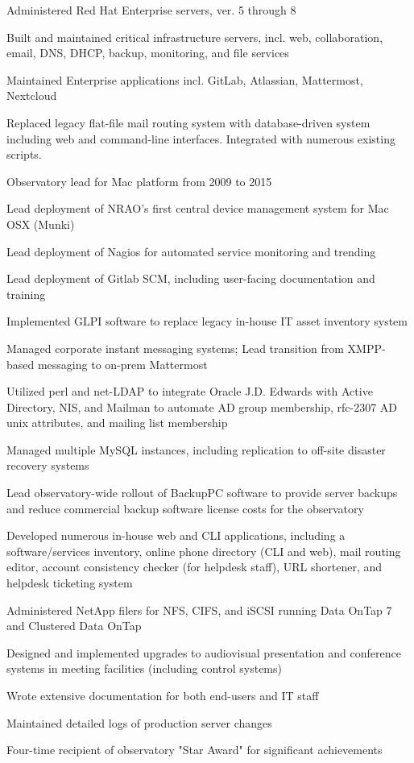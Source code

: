 \documentclass[letterpaper]{deedy-resume-openfont}
\begin{document}
\begin{minipage}[t]{0.69\textwidth}
\begin{tightemize}
	\item Administered Red Hat Enterprise servers, ver. 5 through 8
	\item Built and maintained critical infrastructure servers, incl. web, collaboration, email, DNS, DHCP, backup, monitoring, and file services
	\item Maintained Enterprise applications incl. GitLab, Atlassian, Mattermost, Nextcloud
	\item Replaced legacy flat-file mail routing system with database-driven system including web and command-line interfaces. Integrated with numerous existing scripts.
	\item Observatory lead for Mac platform from 2009 to 2015
	\item Lead deployment of NRAO's first central device management system for Mac OSX (Munki)
	\item Lead deployment of Nagios for automated service monitoring and trending
	\item Lead deployment of Gitlab SCM, including user-facing documentation and training
	\item Implemented GLPI software to replace legacy in-house IT asset inventory system
	\item Managed corporate instant messaging systems; Lead transition from XMPP-based messaging to on-prem Mattermost
	\item Utilized perl and net-LDAP to integrate Oracle J.D. Edwards with Active Directory, NIS, and Mailman to automate AD group membership, rfc-2307 AD unix attributes, and mailing list membership
	\item Managed multiple MySQL instances, including replication to off-site disaster recovery systems
	\item Lead observatory-wide rollout of BackupPC software to provide  server backups and reduce commercial backup software license costs for the observatory
	\item Developed numerous in-house web and CLI applications, including a software/services inventory, online phone directory (CLI and web), mail routing editor, account consistency checker (for helpdesk staff), URL shortener, and helpdesk ticketing system
	\item Administered NetApp filers for NFS, CIFS, and iSCSI running Data OnTap 7 and Clustered Data OnTap
	\item Designed and implemented upgrades to audiovisual presentation and conference systems in meeting facilities (including control systems)
	\item Wrote extensive documentation for both end-users and IT staff
	\item Maintained detailed logs of production server changes
	\item Four-time recipient of observatory "Star Award" for significant achievements
\end{tightemize}

\end{minipage}
\newpage
\end{document}
